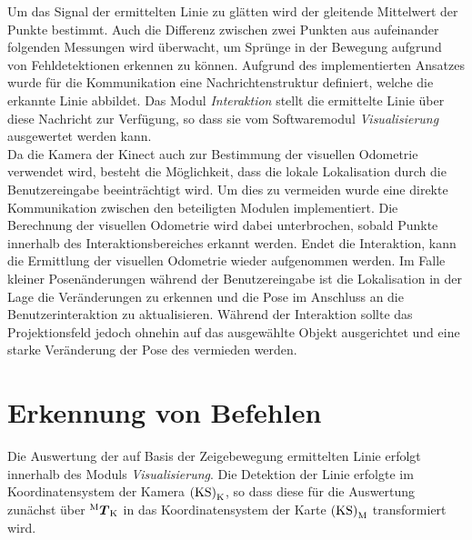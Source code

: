 Um das Signal der ermittelten Linie zu glätten wird der gleitende Mittelwert der Punkte bestimmt. Auch die Differenz zwischen zwei Punkten aus aufeinander folgenden Messungen wird überwacht, um Sprünge in der Bewegung aufgrund von Fehldetektionen erkennen zu können. Aufgrund des implementierten Ansatzes wurde für die Kommunikation eine Nachrichtenstruktur definiert, welche die erkannte Linie abbildet. Das Modul \textit{Interaktion} stellt die ermittelte Linie über diese Nachricht zur Verfügung, so dass sie vom Softwaremodul \textit{Visualisierung} ausgewertet werden kann.\\


Da die Kamera der Kinect auch zur Bestimmung der visuellen Odometrie verwendet wird, besteht die Möglichkeit, dass die lokale Lokalisation durch die Benutzereingabe beeinträchtigt wird. Um dies zu vermeiden wurde eine direkte Kommunikation zwischen den beteiligten Modulen implementiert. Die Berechnung der visuellen Odometrie wird dabei unterbrochen, sobald Punkte innerhalb des Interaktionsbereiches erkannt werden. Endet die Interaktion, kann die Ermittlung der visuellen Odometrie wieder aufgenommen werden. Im Falle kleiner Posenänderungen während der Benutzereingabe ist die Lokalisation in der Lage die Veränderungen zu erkennen und die Pose im Anschluss an die Benutzerinteraktion zu aktualisieren. Während der Interaktion sollte das Projektionsfeld jedoch ohnehin auf das ausgewählte Objekt ausgerichtet und eine starke Veränderung der Pose des  vermieden werden.

\section{Erkennung von Befehlen}
Die Auswertung der auf Basis der Zeigebewegung ermittelten Linie erfolgt innerhalb des Moduls \textit{Visualisierung}. Die Detektion der Linie erfolgte im Koordinatensystem der Kamera ${\mathrm{(KS)}}_{\mathrm{K}}$, so dass diese für die Auswertung zunächst über ${^{\mathrm{M}}\mbox{\boldmath{$T$}}_{\mathrm{K}}}$ in das Koordinatensystem der Karte ${\mathrm{(KS)}}_{\mathrm{M}}$ transformiert wird.\\

